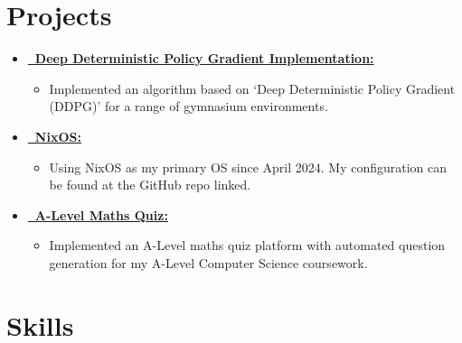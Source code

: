 \documentclass[10pt]{moderncv}
\begin{document}
    \section{Projects}
        \begin{itemize}
            \item\textbf{\href{https://github.com/joe-down/Deep-Deterministic-Policy-Gradient}{\faGithub\ Deep Deterministic Policy Gradient Implementation:}}
                \begin{itemize}
                    \item Implemented an algorithm based on `Deep Deterministic Policy Gradient (DDPG)' for a range of gymnasium environments.
                \end{itemize}
        \end{itemize}
                \begin{itemize}
            \item\textbf{\href{https://github.com/joe-down/NixOS-config}{\faGithub\ NixOS:}}
                \begin{itemize}
                    \item Using NixOS as my primary OS since April 2024. My configuration can be found at the GitHub repo linked.
                \end{itemize}
                            \item\textbf{\href{https://github.com/joe-down/A-Level-Coursework}{\faGithub\ A-Level Maths Quiz:}}
                \begin{itemize}
                    \item Implemented an A-Level maths quiz platform with automated question generation for my A-Level Computer Science coursework.
                \end{itemize}
        \end{itemize}
    \section{Skills}
\end{document}
